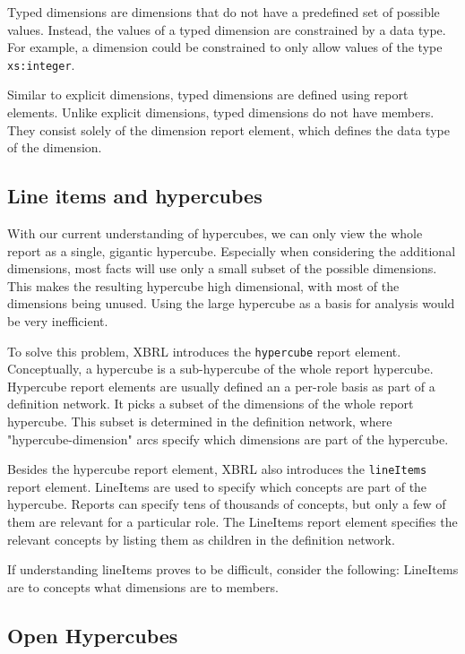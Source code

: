 Typed dimensions are dimensions that do not have a predefined set of possible values.
Instead, the values of a typed dimension are constrained by a data type.
For example, a dimension could be constrained to only allow values of the type \texttt{xs:integer}.

Similar to explicit dimensions, typed dimensions are defined using report elements.
Unlike explicit dimensions, typed dimensions do not have members.
They consist solely of the dimension report element, which defines the data type of the dimension.

\subsection{Line items and hypercubes}

With our current understanding of hypercubes, we can only view the whole report as a single, gigantic hypercube.
Especially when considering the additional dimensions, most facts will use only a small subset of the possible dimensions.
This makes the resulting hypercube high dimensional, with most of the dimensions being unused.
Using the large hypercube as a basis for analysis would be very inefficient.

To solve this problem, XBRL introduces the \texttt{hypercube} report element.
Conceptually, a hypercube is a sub-hypercube of the whole report hypercube.
Hypercube report elements are usually defined an a per-role basis as part of a definition network.
It picks a subset of the dimensions of the whole report hypercube.
This subset is determined in the definition network, where "hypercube-dimension" arcs specify which dimensions are part of the hypercube.

Besides the hypercube report element, XBRL also introduces the \texttt{lineItems} report element.
LineItems are used to specify which concepts are part of the hypercube.
Reports can specify tens of thousands of concepts, but only a few of them are relevant for a particular role.
The LineItems report element specifies the relevant concepts by listing them as children in the definition network.

If understanding lineItems proves to be difficult, consider the following: 
LineItems are to concepts what dimensions are to members.

\subsection{Open Hypercubes}


